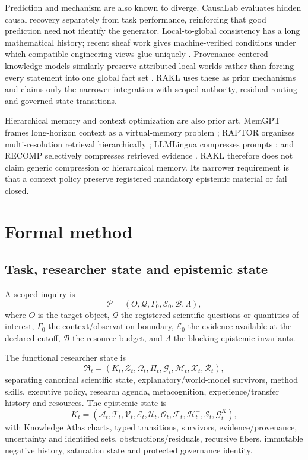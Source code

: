 \documentclass[11pt]{article}
\newcommand{\RAKL}{\textsc{RAKL}}
\begin{document}
Prediction and mechanism are also known to diverge. CausaLab evaluates hidden causal recovery separately from task performance, reinforcing that good prediction need not identify the generator. Local-to-global consistency has a long mathematical history; recent sheaf work gives machine-verified conditions under which compatible engineering views glue uniquely \citep{gibson2026sheaves}. Provenance-centered knowledge models similarly preserve attributed local worlds rather than forcing every statement into one global fact set \citep{vitali2026provenance}. \RAKL{} uses these as prior mechanisms and claims only the narrower integration with scoped authority, residual routing and governed state transitions.

Hierarchical memory and context optimization are also prior art. MemGPT frames long-horizon context as a virtual-memory problem \citep{packer2023memgpt}; RAPTOR organizes multi-resolution retrieval hierarchically \citep{sarthi2024raptor}; LLMLingua compresses prompts \citep{jiang2023llmlingua}; and RECOMP selectively compresses retrieved evidence \citep{xu2023recomp}. \RAKL{} therefore does not claim generic compression or hierarchical memory. Its narrower requirement is that a context policy preserve registered mandatory epistemic material or fail closed.

\section{Formal method}
\subsection{Task, researcher state and epistemic state}
A scoped inquiry is
\begin{equation}
\mathcal P=(O,\mathcal Q,\Gamma_0,\mathcal E_0,\mathcal B,\Lambda),
\end{equation}
where $O$ is the target object, $\mathcal Q$ the registered scientific questions or quantities of interest, $\Gamma_0$ the context/observation boundary, $\mathcal E_0$ the evidence available at the declared cutoff, $\mathcal B$ the resource budget, and $\Lambda$ the blocking epistemic invariants.

The functional researcher state is
\begin{equation}
\mathfrak R_t=(K_t,\mathcal Z_t,\Omega_t,\Pi_t,\mathcal G_t,\mathcal M_t,\mathcal X_t,\mathcal R_t),
\end{equation}
separating canonical scientific state, explanatory/world-model survivors, method skills, executive policy, research agenda, metacognition, experience/transfer history and resources. The epistemic state is
\begin{equation}
K_t=(\mathcal A_t,\mathcal T_t,\mathcal V_t,\mathcal E_t,\mathcal U_t,\mathcal O_t,\mathcal F_t,\mathcal H_t^{-},\mathcal S_t,\mathcal G_t^K),
\end{equation}
with Knowledge Atlas charts, typed transitions, survivors, evidence/provenance, uncertainty and identified sets, obstructions/residuals, recursive fibers, immutable negative history, saturation state and protected governance identity.
\end{document}
